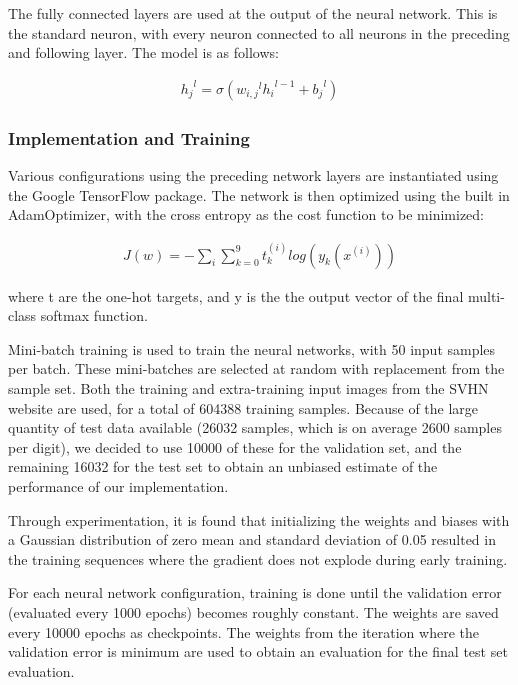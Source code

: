 \documentclass{article} %
\begin{document}
The fully connected layers are used at the output of the neural network. This is the standard neuron, with every neuron connected to all neurons in the preceding and following layer. The model is as follows:

\begin{gather}
{h_{j}}^l = \sigma({w_{i,j}}^{l} {h_{i}}^{l-1} + {b_j}^l) 
\end{gather}

\subsubsection{Implementation and Training}

Various configurations using the preceding network layers are instantiated using the Google TensorFlow package. The network is then optimized using the built in AdamOptimizer, with the cross entropy as the cost function to be minimized:

\begin{gather}
J(w) = - \sum_{i}{\sum_{k=0}^{9}{t^{(i)}_k}log(y_k(x^{(i)}))}
\end{gather}

where t are the one-hot targets, and y is the the output vector of the final multi-class softmax function. 

Mini-batch training is used to train the neural networks, with 50 input samples per batch. These mini-batches are selected at random with replacement from the sample set. Both the training and extra-training input images from the SVHN website are used, for a total of 604388 training samples. Because of the large quantity of test data available (26032 samples, which is on average 2600 samples per digit), we decided to use 10000 of these for the validation set, and the remaining 16032 for the test set to obtain an unbiased estimate of the performance of our implementation.

Through experimentation, it is found that initializing the weights and biases with a Gaussian distribution of zero mean and standard deviation of 0.05 resulted in the training sequences where the gradient does not explode during early training. 

For each neural network configuration, training is done until the validation error (evaluated every 1000 epochs) becomes roughly constant. The weights are saved every 10000 epochs as checkpoints. The weights from the iteration where the validation error is minimum are used to obtain an evaluation for the final test set evaluation. 
\end{document}
